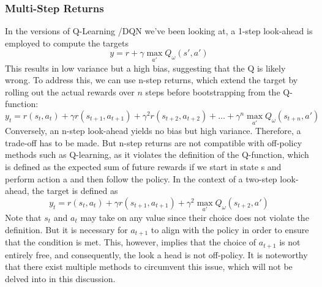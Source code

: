 \subsubsection{Multi-Step Returns} \label{multi_steps}
In the versions of Q-Learning /DQN we've been looking at, a 1-step look-ahead is employed to compute the targets 
$$y = r + \gamma \max\limits_{a'}Q_\omega(s',a')$$
This results in low variance but a high bias, suggesting that the Q is likely 
wrong. \newline 
To address this, we can use n-step returns, which extend the target by rolling out the actual rewards over $n$
steps before bootstrapping from the Q-function:
$$y_t = r(s_t,a_t)+ \gamma r(s_{t+1},a_{t+1})+ \gamma^2  r(s_{t+2},a_{t+2})+\dots+\gamma^n\max\limits_{a'}Q_\omega(s_{t+n},a')$$
Conversely, an n-step look-ahead yields no bias but high variance. Therefore,
a trade-off has to be made. But n-step returns are not compatible with off-policy methods such 
as Q-learning, as it violates the definition of the Q-function, which is defined as 
the expected sum of future rewards if we start in state s and perform action a and 
then follow the policy. In the context of a two-step look-ahead, the target is defined as
$$y_t = r(s_t,a_t)+ \gamma r(s_{t+1},a_{t+1})+\gamma^2\max\limits_{a'}Q_\omega(s_{t+2},a')$$
Note that $s_t$ and $a_t$ may take on any value since their choice does not violate 
the definition. But it is necessary for $a_{t+1}$ to align with the policy in order 
to ensure that the condition is met. This, however, implies that the choice of 
$a_{t+1}$ is not entirely free, and consequently, the look a head is not off-policy. 
It is noteworthy that there exist multiple methods to circumvent this issue, which 
will not be delved into in this discussion.

